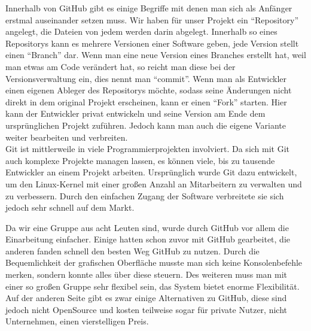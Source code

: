 	Innerhalb von GitHub gibt es einige Begriffe mit denen man sich als Anfänger erstmal auseinander setzen muss. 
	Wir haben für unser Projekt ein \enquote{Repository} angelegt, die Dateien von jedem werden darin abgelegt. Innerhalb so eines Repositorys kann es mehrere Versionen einer Software geben, jede Version stellt einen \enquote{Branch} dar. Wenn man eine neue Version eines Branches erstellt hat, weil man etwas am Code verändert hat, so reicht man diese bei der Versionsverwaltung ein, dies nennt man \enquote{commit}. Wenn man als Entwickler einen eigenen Ableger des Repositorys möchte, sodass seine Änderungen nicht direkt in dem original Projekt erscheinen, kann er einen \enquote{Fork} starten. Hier kann der Entwickler privat entwickeln und seine Version am Ende dem ursprünglichen Projekt zuführen. Jedoch kann man auch die eigene Variante weiter bearbeiten und verbreiten.
	\\Git ist mittlerweile in viele Programmierprojekten involviert. Da sich mit Git auch komplexe Projekte managen lassen, es können viele, bis zu tausende Entwickler an einem Projekt arbeiten. Ursprünglich wurde Git dazu entwickelt, um den Linux-Kernel mit einer großen Anzahl an Mitarbeitern zu verwalten und zu verbessern. Durch den einfachen Zugang der Software verbreitete sie sich jedoch sehr schnell auf dem Markt.
	
	Da wir eine Gruppe aus acht Leuten sind, wurde durch GitHub vor allem die Einarbeitung einfacher. Einige hatten schon zuvor mit GitHub gearbeitet, die anderen fanden schnell den besten Weg GitHub zu nutzen. Durch die Bequemlichkeit der grafischen Oberfläche musste man sich keine Konsolenbefehle merken, sondern konnte alles über diese steuern. Des weiteren muss man mit einer so großen Gruppe sehr flexibel sein, das System bietet enorme Flexibilität.
	Auf der anderen Seite gibt es zwar einige Alternativen zu GitHub, diese sind jedoch nicht OpenSource und kosten teilweise sogar für private Nutzer, nicht Unternehmen, einen vierstelligen Preis.
	
